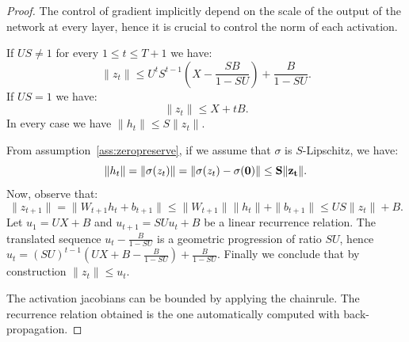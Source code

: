     \begin{proof}

    The control of gradient implicitly depend on the scale of the output of the network at every layer, hence it is crucial to control the norm of each activation.
    
    \begin{lemma}\label{thm:boundedactivations}
    If $US\neq 1$ for every $1\leq t\leq T+1$ we have:
        \begin{equation}
        \|z_t\|\leq U^tS^{t-1}\left(X-\frac{SB}{1-SU}\right)+\frac{B}{1-SU}.
        \end{equation}
    If $US=1$ we have:
        \begin{equation}
        \|z_t\|\leq X+tB.
        \end{equation}
    In every case we have $\|h_t\|\leq S\|z_t\|$.
    \end{lemma}
    \begin{subproof}
    From assumption~\ref{ass:zeropreserve}, if we assume that $\sigma$ is $S$-Lipschitz, we have:
    \begin{equation}
        \|h_t\|=\|\sigma(z_t)\|=\|\sigma(z_t)-\sigma(\bf {0})\|\leq S\|z_t\|.
    \end{equation}
    Now, observe that:
    \begin{equation}
        \|z_{t+1}\|=\|W_{t+1}h_t+b_{t+1}\|\leq \|W_{t+1}\|\|h_t\|+\|b_{t+1}\|\leq US\|z_t\|+B.
    \end{equation}
        Let $u_1=UX+B$ and $u_{t+1}=SUu_t+B$ be a linear recurrence relation.  
        The translated sequence $u_t-\frac{B}{1-SU}$ is a geometric progression of ratio $SU$, hence $u_t=(SU)^{t-1}(UX+B-\frac{B}{1-SU})+\frac{B}{1-SU}$.  
        Finally we conclude that by construction $\|z_t\|\leq u_t$.  
    \end{subproof}
    
    
    The activation jacobians can be bounded by applying the chainrule. The recurrence relation obtained is the one automatically computed with back-propagation.  
    

\end{proof}

